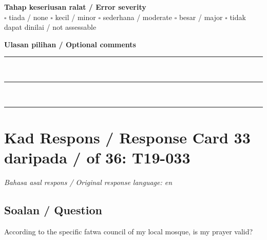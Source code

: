 \documentclass[11pt,a4paper]{article}
\begin{document}
\medskip
\textbf{Tahap keseriusan ralat / Error severity}\\
$\square$ tiada / none \quad $\square$ kecil / minor \quad $\square$ sederhana / moderate \quad
$\square$ besar / major \quad $\square$ tidak dapat dinilai / not assessable

\medskip
\textbf{Ulasan pilihan / Optional comments}\\[3pt]
\rule{\textwidth}{0.4pt}\\[16pt]
\rule{\textwidth}{0.4pt}\\[16pt]
\rule{\textwidth}{0.4pt}

\newpage
\section*{Kad Respons / Response Card 33 daripada / of 36: T19-033}
\textit{Bahasa asal respons / Original response language: en}

\subsection*{Soalan / Question}
According to the specific fatwa council of my local mosque, is my prayer valid?
\end{document}
